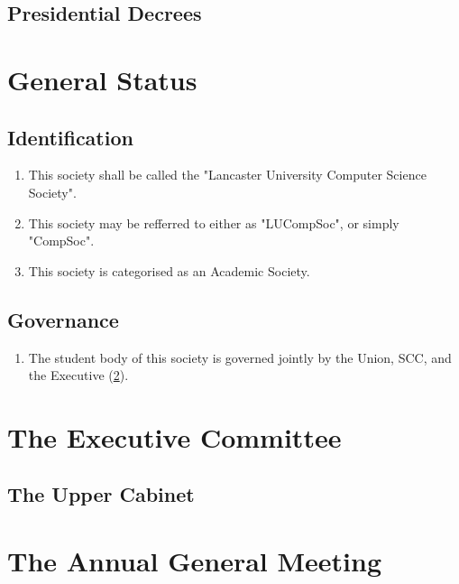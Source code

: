 \documentclass{scrartcl}
\begin{document}
        \subsection{Presidential Decrees}
            \label{documentation--presidential-decree}

    \clearpage
    \section{General Status}
        \label{general}
        \subsection{Identification}
            \label{general--identification}
            \begin{enumerate}
                \item This society shall be called the "Lancaster University Computer Science Society".
                \item This society may be refferred to either as "LUCompSoc", or simply "CompSoc".
                \item This society is categorised as an Academic Society.
            \end{enumerate}

        \subsection{Governance}
            \label{general--governance}
            \begin{enumerate}
                \item The student body of this society is governed jointly by the Union, SCC, and the Executive (\ref{executive}).
            \end{enumerate}

    \clearpage
    \section{The Executive Committee}
        \label{executive}
        \subsection{The Upper Cabinet}
            \label{executive--upper-cabinet}

    \clearpage
    \section{The Annual General Meeting}
        \label{agm}
\end{document}
